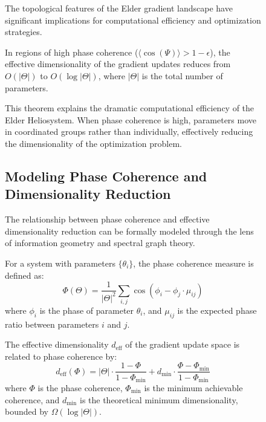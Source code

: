 \begin{figure}[ht]
The topological features of the Elder gradient landscape have significant implications for computational efficiency and optimization strategies.

\begin{theorem}
In regions of high phase coherence ($\langle\cos(\Psi)\rangle > 1-\epsilon$), the effective dimensionality of the gradient updates reduces from $O(|\Theta|)$ to $O(\log|\Theta|)$, where $|\Theta|$ is the total number of parameters.
\end{theorem}

This theorem explains the dramatic computational efficiency of the Elder Heliosystem. When phase coherence is high, parameters move in coordinated groups rather than individually, effectively reducing the dimensionality of the optimization problem.

\subsection{Modeling Phase Coherence and Dimensionality Reduction}

The relationship between phase coherence and effective dimensionality reduction can be formally modeled through the lens of information geometry and spectral graph theory.

\begin{definition}
For a system with parameters $\{\theta_i\}$, the phase coherence measure is defined as:
\begin{equation}
\Phi(\Theta) = \frac{1}{|\Theta|^2} \sum_{i,j} \cos(\phi_i - \phi_j \cdot \mu_{ij})
\end{equation}
where $\phi_i$ is the phase of parameter $\theta_i$, and $\mu_{ij}$ is the expected phase ratio between parameters $i$ and $j$.
\end{definition}

\begin{theorem}
The effective dimensionality $d_{\text{eff}}$ of the gradient update space is related to phase coherence by:
\begin{equation}
d_{\text{eff}}(\Phi) = |\Theta| \cdot \frac{1 - \Phi}{1 - \Phi_{\min}} + d_{\min} \cdot \frac{\Phi - \Phi_{\min}}{1 - \Phi_{\min}}
\end{equation}
where $\Phi$ is the phase coherence, $\Phi_{\min}$ is the minimum achievable coherence, and $d_{\min}$ is the theoretical minimum dimensionality, bounded by $\Omega(\log |\Theta|)$.
\end{theorem}


\end{figure}
